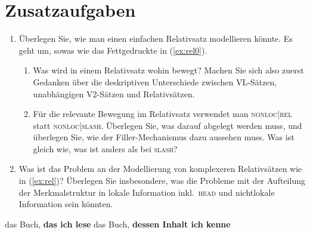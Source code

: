 \documentclass[10pt,a3paper]{article}
\newcommand{\blau}[1]{\textcolor{blau}{#1}}
\newcommand{\Sub}[1]{\ensuremath{_{\text{#1}}}}
\newcommand{\Zeile}{\vspace{\baselineskip}}
\newcommand{\Halbzeile}{\vspace{0.5\baselineskip}}
\begin{document}


\section{Zusatzaufgaben}

\begin{enumerate}
  \item Überlegen Sie, wie man einen einfachen Relativsatz modellieren könnte.
    Es geht um, sowas wie das Fettgedruckte in (\ref{ex:rel0}).
    \begin{enumerate}
      \item Was wird in einem Relativsatz wohin bewegt?
        Machen Sie sich also zuerst Gedanken über die deskriptiven Unterschiede zwischen VL-Sätzen, unabhängigen V2-Sätzen und Relativsätzen.
      \item Für die relevante Bewegung im Relativsatz verwendet man \textsc{nonloc|rel} statt \textsc{nonloc|slash}.
        Überlegen Sie, was darauf abgelegt werden muss, und überlegen Sie, wie der Filler-Mechanismus dazu aussehen muss.
        Was ist gleich wie, was ist anders als bei \textsc{slash}?
    \end{enumerate}
    \Halbzeile
  \item Was ist das Problem an der Modellierung von komplexeren Relativsätzen wie in (\ref{ex:rel})?
    Überlegen Sie insbesondere, was die Probleme mit der Aufteilung der Merkmalstruktur in lokale Information inkl.\ \textsc{head} und nichtlokale Information sein könnten.
\end{enumerate}

\Zeile

\begin{exe}
  \ex\label{ex:rel0} das Buch, \textbf{das ich lese}
  \ex\label{ex:rel} das Buch, \textbf{dessen Inhalt ich kenne}
\end{exe}
\end{document}
